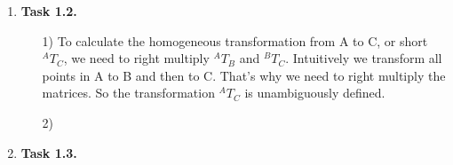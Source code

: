\documentclass[a4paper,11pt]{article}
\begin{document}
\begin {enumerate}
\begin{enumerate}
        
        \item[2)] In this case we use Gimbal-angles, we need to right multiply the given transformation matrices. We get the following transformation matrix:
		$$M' \approx \begin{bmatrix}
			0.43559574039916 & -0.43559574039916 & 0.43301270189222 & 0\\
-0.61237243569579 & 0.61237243569579 & -0.5 & 0\\
0.047367172745376 & -0.047367172745376 & 0.75 & 0\\
0 & 0 & 0 & 1
		\end{bmatrix}$$
		After multiplying it with the given points, we get
		\begin{align*}
			A'' &\approx (4.3559574039916, -6.1237243569579, 0.47367172745376),\\
			B'' &\approx (4.4408920985006 \cdot 10^{-16}, 4.4408920985006  \cdot 10^{-16}, 5.5511151231258 \cdot 10^{-16}),\\
			C'' &\approx (-4.3559574039916, 6.1237243569579, -0.47367172745376),\\
			D'' &\approx (-4.4408920985006 \cdot 10^{-16}, -4.4408920985006 \cdot 10^{-16}, -5.5511151231258 \cdot 10^{-16}),\\
			E'' &\approx (12.990381056767, -15, 22.5)
		\end{align*}
    \end{enumerate}

\item[\textbf{Task 1.2.}]

    \begin{enumerate}
        \item[1)] To calculate the homogeneous transformation from A to C, or short $^{A}T_{C}$, we need to right multiply $^{A}T_{B}$ and $^{B}T_{C}$. Intuitively we transform all points in A to B and then to C. That's why we need to right multiply the matrices. So the transformation $^{A}T_{C}$ is unambiguously defined.
        \item[2)]
    \end{enumerate}

\item[\textbf{Task 1.3.}]


\end{enumerate}
\end{document}
